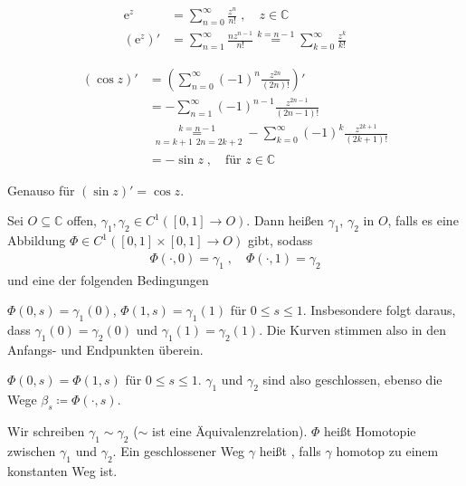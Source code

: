 
\begin{example}
  \begin{enum-arab}
    \item
    \begin{align*}
      \mathrm{e}^z &= \sum\limits_{n=0}^{\infty} \frac{z^n}{n!} \; , \quad z \in \mathbb{C} \\
      (\mathrm{e}^z)' &= \sum\limits_{n=1}^{\infty} \frac{n z^{n-1}}{n!} \overset{k = n-1}{=}
        \sum\limits_{k=0}^{\infty} \frac{z^k}{k!}
    \end{align*}
    
    \item
    \begin{align*}
      (\cos z)'
      &= \left( \sum\limits_{n=0}^{\infty} (-1)^n \frac{z^{2n}}{(2n)!} \right)' \\
      &= - \sum\limits_{n=1}^{\infty} (-1)^{n-1} \frac{z^{2n-1}}{(2n-1)!} \\
      &\overset{k=n-1}{\underset{\substack{n=k+1}{2n = 2k+2}}{=}}
      - \sum\limits_{k=0}^{\infty} (-1)^{k} \frac{z^{2k+1}}{(2k+1)!} \\
      &= - \sin z \; , \quad \text{für } z \in \mathbb{C}
    \end{align*}
    
    \item Genauso für $(\sin z)' = \cos z$.
  \end{enum-arab}
\end{example}

\begin{theorem}[Definition]
  Sei $O \subseteq \mathbb{C}$ offen, $\gamma_1, \gamma_2 \in C^1([0,1] \to O)$. Dann heißen $\gamma_1$, $\gamma_2$  in $O$, falls es eine Abbildung $\Phi \in C^1([0,1] \times [0,1] \to O)$ gibt, sodass
  \begin{align*}
    \Phi(\cdot,0) = \gamma_1 \; , \quad \Phi(\cdot,1) = \gamma_2
  \end{align*}
  und eine der folgenden Bedingungen
  \begin{enum-roman}
    \item $\Phi(0,s) = \gamma_1(0)$, $\Phi(1,s) = \gamma_1(1)$ für $0 \leq s \leq 1$. Insbesondere folgt daraus, dass $\gamma_1(0) = \gamma_2(0)$ und $\gamma_1(1) = \gamma_2(1)$. Die Kurven stimmen also in den Anfangs- und Endpunkten überein.
    
    \item $\Phi(0,s) = \Phi(1,s)$ für $0 \leq s \leq 1$. $\gamma_1$ und $\gamma_2$ sind also geschlossen, ebenso die Wege $\beta_s \coloneq \Phi(\cdot,s)$.
  \end{enum-roman}
  Wir schreiben $\gamma_1 \sim \gamma_2$ ($\sim$ ist eine Äquivalenzrelation). $\Phi$ heißt Homotopie zwischen $\gamma_1$ und $\gamma_2$. Ein geschlossener Weg $\gamma$ heißt , falls $\gamma$ homotop zu einem konstanten Weg ist.
\end{theorem}

